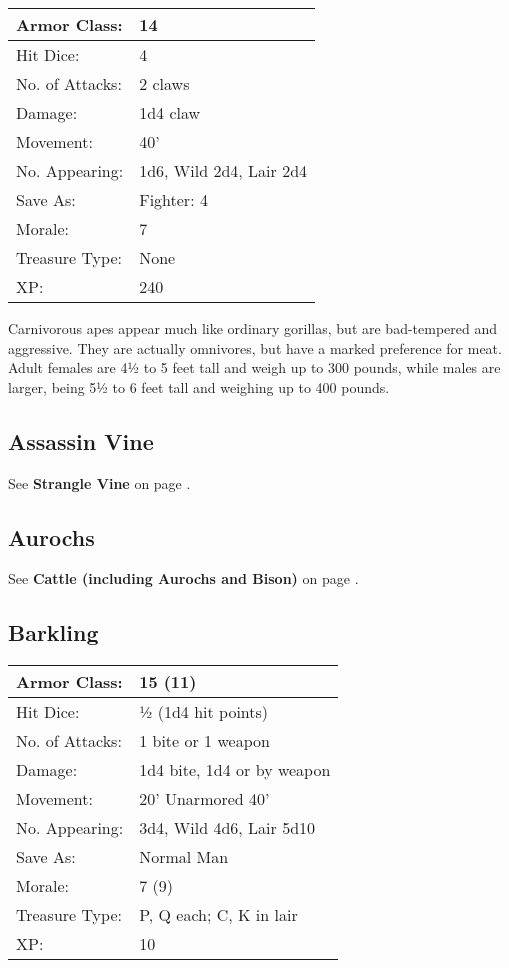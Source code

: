 \documentclass[a4paper,twoside,openany,10pt]{book}
\begin{document}
\begin{multicols}{2}
\begin{tabularx}{0.48\textwidth}{ll}
Armor Class: & 14 \\\hline
Hit Dice: & 4 \\\hline
No. of Attacks: & 2 claws \\\hline
Damage: & 1d4 claw \\\hline
Movement: & 40' \\\hline
No. Appearing: & 1d6, Wild 2d4, Lair 2d4 \\\hline
Save As: & Fighter: 4 \\\hline
Morale: & 7 \\\hline
Treasure Type: & None \\\hline
XP: & 240 \\\hline
\end{tabularx}\medskip

Carnivorous apes appear much like ordinary gorillas, but are bad-tempered and aggressive. They are actually omnivores, but have a marked preference for meat. Adult females are 4½ to 5 feet tall and weigh up to 300 pounds, while males are larger, being 5½ to 6 feet tall and weighing up to 400 pounds.

\subsection*{Assassin Vine}\label{assassin-vine}

See \textbf{Strangle Vine} on page \hyperlink{strangle-vine}{\pageref{strangle-vine}}.

\pagebreak

\subsection*{Aurochs}\label{aurochs}

See \textbf{Cattle (including Aurochs and Bison)} on page
\hyperlink{cattle-including-aurochs-and-bison}{\pageref{cattle-including-aurochs-and-bison}}.

\subsection*{Barkling}\label{barkling}

\begin{tabularx}{0.48\textwidth}{ll}
Armor Class: & 15 (11) \\\hline
Hit Dice: & ½ (1d4 hit points) \\\hline
No. of Attacks: & 1 bite or 1 weapon \\\hline
Damage: & 1d4 bite, 1d4 or by weapon \\\hline
Movement: & 20' Unarmored 40' \\\hline
No. Appearing: & 3d4, Wild 4d6, Lair 5d10 \\\hline
Save As: & Normal Man \\\hline
Morale: & 7 (9) \\\hline
Treasure Type: & P, Q each; C, K in lair \\\hline
XP: & 10 \\\hline
\end{tabularx}\medskip


\end{multicols}
\end{document}
